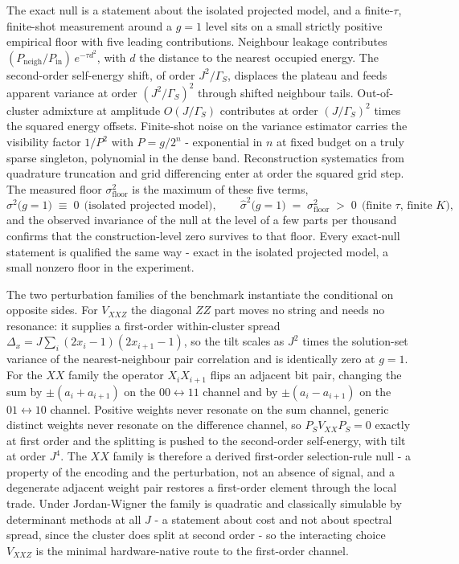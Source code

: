 The exact null is a statement about the isolated projected model, and a finite-$\tau$, finite-shot measurement around a $g = 1$ level sits on a small strictly positive empirical floor with five leading contributions. Neighbour leakage contributes $(P_{\mathrm{neigh}}/P_{\mathrm{in}})\, e^{-\tau d^2}$, with $d$ the distance to the nearest occupied energy. The second-order self-energy shift, of order $J^2/\Gamma_S$, displaces the plateau and feeds apparent variance at order $(J^2/\Gamma_S)^2$ through shifted neighbour tails. Out-of-cluster admixture at amplitude $O(J/\Gamma_S)$ contributes at order $(J/\Gamma_S)^2$ times the squared energy offsets. Finite-shot noise on the variance estimator carries the visibility factor $1/P^2$ with $P = g/2^n$ - exponential in $n$ at fixed budget on a truly sparse singleton, polynomial in the dense band. Reconstruction systematics from quadrature truncation and grid differencing enter at order the squared grid step. The measured floor $\sigma^2_{\mathrm{floor}}$ is the maximum of these five terms,
\begin{equation}\label{def:null-channel}
\sigma^2\bigl(g{=}1\bigr) \;\equiv\; 0 \ \ \text{(isolated projected model)}, \qquad \hat\sigma^2\bigl(g{=}1\bigr) \;=\; \sigma^2_{\mathrm{floor}} \;>\; 0 \ \ \text{(finite $\tau$, finite $K$)},
\end{equation}
and the observed invariance of the null at the level of a few parts per thousand confirms that the construction-level zero survives to that floor. Every exact-null statement is qualified the same way - exact in the isolated projected model, a small nonzero floor in the experiment.

The two perturbation families of the benchmark instantiate the conditional on opposite sides. For $V_{XXZ}$ the diagonal $ZZ$ part moves no string and needs no resonance: it supplies a first-order within-cluster spread $\Delta_x = J \sum_i (2x_i - 1)(2x_{i+1} - 1)$, so the tilt scales as $J^2$ times the solution-set variance of the nearest-neighbour pair correlation and is identically zero at $g = 1$. For the $XX$ family the operator $X_i X_{i+1}$ flips an adjacent bit pair, changing the sum by $\pm(a_i + a_{i+1})$ on the $00 \leftrightarrow 11$ channel and by $\pm(a_i - a_{i+1})$ on the $01 \leftrightarrow 10$ channel. Positive weights never resonate on the sum channel, generic distinct weights never resonate on the difference channel, so $P_S V_{XX} P_S = 0$ exactly at first order and the splitting is pushed to the second-order self-energy, with tilt at order $J^4$. The $XX$ family is therefore a derived first-order selection-rule null - a property of the encoding and the perturbation, not an absence of signal, and a degenerate adjacent weight pair restores a first-order element through the local trade. Under Jordan-Wigner the family is quadratic and classically simulable by determinant methods at all $J$ \cite{valiant2002matchgates,terhal2002fermions,jozsa2008matchgates} - a statement about cost and not about spectral spread, since the cluster does split at second order - so the interacting choice $V_{XXZ}$ is the minimal hardware-native route to the first-order channel.

